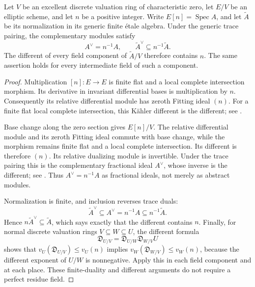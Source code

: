 \begin{lemma}\label{lem:torsion-different}
Let $V$ be an excellent discrete valuation ring of characteristic zero,
let $E/V$ be an elliptic scheme, and let $n$ be a positive integer.
Write $E[n]=\operatorname{Spec} A$, and let $\widetilde A$ be its
normalization in its generic finite \'etale algebra. Under the generic
trace pairing, the complementary modules satisfy
\[
 A^\vee=n^{-1}A,\qquad
 \widetilde A^\vee\subseteq n^{-1}\widetilde A.
\]
The different of every field component of $\widetilde A/V$ therefore
contains $n$. The same assertion holds for every intermediate field
of such a component.
\end{lemma}
\begin{proof}
Multiplication $[n]:E\to E$ is finite flat and a local complete
intersection morphism. Its derivative in invariant differential bases
is multiplication by $n$. Consequently its relative differential
module has zeroth Fitting ideal $(n)$. For a finite flat local complete
intersection, this K\"ahler different is the different; see
\cite[Tag~0BWB, Lemmas~49.12.3 and~49.12.6]{Stacks}.

Base change along the zero section gives $E[n]/V$. The relative
differential module and its zeroth Fitting ideal commute with base
change, while the morphism remains finite flat and a local complete
intersection. Its different is therefore $(n)$. Its relative
dualizing module is invertible. Under the trace pairing this is the
complementary fractional ideal $A^\vee$, whose inverse is the different;
see \cite[Tag~0BW0, Lemmas~49.8.2--49.8.3, and Tag~0BWB,
Lemma~49.12.4]{Stacks}. Thus $A^\vee=n^{-1}A$ as fractional ideals,
not merely as abstract modules.

Normalization is finite, and inclusion reverses trace duals:
\[
 \widetilde A^\vee\subseteq A^\vee=n^{-1}A
                              \subseteq n^{-1}\widetilde A.
\]
Hence $n\widetilde A^\vee\subseteq\widetilde A$, which says exactly
that the different contains $n$. Finally, for normal discrete
valuation rings $V\subseteq W\subseteq U$, the different formula
\[
 \mathfrak D_{U/V}=\mathfrak D_{U/W}\mathfrak D_{W/V}U
\]
shows that $v_U(\mathfrak D_{U/V})\le v_U(n)$ implies
$v_W(\mathfrak D_{W/V})\le v_W(n)$, because the different exponent
of $U/W$ is nonnegative. Apply this in each field component and
at each place. These finite-duality and different arguments do not
require a perfect residue field.
\end{proof}

